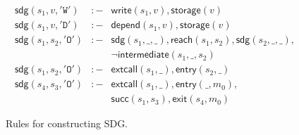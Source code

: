\documentclass[conference, romanappendices]{tex/IEEEtran}
\theoremstyle{bfnote}
\begin{document}
\begin{figure}[ht]
	\small
	\[\begin{array}{rlll}
	\mathsf{sdg}(s_1, v, \mathtt{'W'}) & :- & \mathsf{write}(s_1, v), \mathsf{storage}(v)\\
	\mathsf{sdg}(s_1, v, \mathtt{'D'}) & :- &  \mathsf{depend}(s_1, v), \mathsf{storage}(v)\\
	\mathsf{sdg}(s_1, s_2, \mathtt{'O'}) & :- &  \mathsf{sdg}(s_1, \_, \_), \mathsf{reach}(s_1, s_2), \mathsf{sdg}(s_2, \_, \_), \\
	& & \neg\mathsf{intermediate}(s_1, \_, s_2)\\
	\mathsf{sdg}(s_1, s_2, \mathtt{'O'}) & :- & \mathsf{extcall}(s_1, \_), \mathsf{entry}(s_2,\_)\\
	\mathsf{sdg}(s_4, s_3, \mathtt{'O'}) & :- & \mathsf{extcall}(s_1, \_), \mathsf{entry}(\_,m_0), \\
	& & \mathsf{succ}(s_1, s_3), \mathsf{exit}(s_4, m_0)
	\end{array}\]
	\vspace{-4mm}
	\caption{\small Rules for constructing SDG.}
	\label{fig:sdg-rule}
	\vspace{-5mm}
\end{figure}
\end{document}
